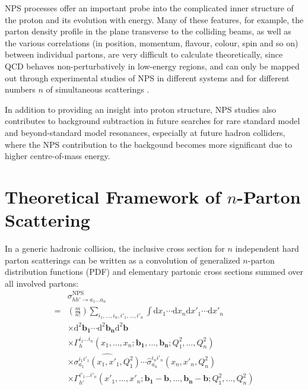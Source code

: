 \documentclass[10pt,twocolumn]{article}
\begin{document}
NPS processes offer an important probe into the complicated inner structure of the proton and its evolution with energy.\cite{DIEHL_MPI}\cite{BLOK_MPS} Many of these features, for example, the parton density profile in the plane transverse to the colliding beams, as well as the various correlations (in position, momentum, flavour, colour, spin and so on) between individual partons, are very difficult to calculate theoretically, since QCD behaves non-perturbatively in low-energy regions, and can only be mapped out through experimental studies of NPS in different systems and for different numbers $n$ of simultaneous scatterings \cite{MPI_LHC}.

In addition to providing an insight into proton structure, NPS studies also contributes to background subtraction in future searches for rare standard model and beyond-standard model resonances, especially at future hadron colliders, where the NPS contribution to the backgound becomes more significant due to higher centre-of-mass energy.\cite{DdE_TPS}\cite{YJZ_TRI_JPSI}

\section{\texorpdfstring{Theoretical Framework of $n$-Parton Scattering}{Theoretical Framework of n-Parton Scattering}}

In a generic hadronic collision, the inclusive cross section for $n$ independent hard parton scatterings can be written as a convolution of generalized $n$-parton distribution functions (PDF) and elementary partonic cross sections summed over all involved partons:
\begin{equation}
    \label{eqn:nps_general}
    \begin{aligned}
        &
            \sigma_{hh'\to a_1\dots a_n}^{\text{NPS}} 
        \\
        =
        &
            \left(\frac{m}{n!}\right) \sum_{i_1,\dots,i_n,i'_1,\dots,i'_n} \int \mathrm{d} x_1 \cdots \mathrm{d} x_n \mathrm{d} x'_1 \cdots \mathrm{d} x'_n
        \\
        &
            \times \mathrm{d}^2 \mathbf{b_1} \cdots \mathrm{d}^2 \mathbf{b_n} \mathrm{d}^2 \mathbf{b}
        \\
        &
            \times \Gamma_h^{i_1\dots i_n}(x_1,\dots,x_n;\mathbf{b_1},\dots,\mathbf{b_n};Q_1^2,\dots,Q_n^2)
         \\
        &
            \times \hat{\sigma_{a_1}^{i_1 i'_1}(x_1,x'_1,Q_1^2)}\cdots \hat{\sigma}_{a_n}^{i_n i'_n}(x_n,x'_n,Q_n^2)
        \\
        &
            \times \Gamma_{h'}^{i'_1\dots i'_n}(x'_1,\dots,x'_n;\mathbf{b_1}-\mathbf{b},\dots,\mathbf{b_n}-\mathbf{b};Q_1^2,\dots,Q_n^2)
    \end{aligned}
\end{equation}
\end{document}
